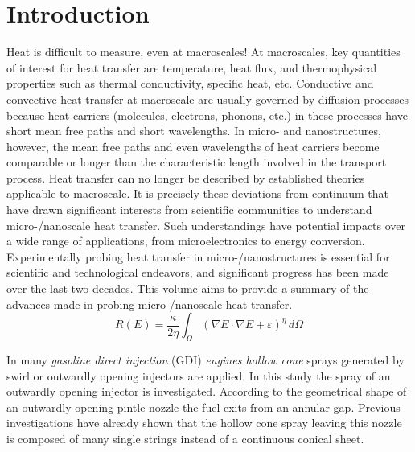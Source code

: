 \documentclass[article,authoryear,jfv]{beg_32}             %
\begin{document}
\section{Introduction}
Heat is difficult to measure, even at macroscales! At macroscales, key
quantities of interest for heat transfer are temperature, heat flux, and
thermophysical properties such as thermal conductivity, specific heat, etc.
Conductive and convective heat transfer at macroscale are usually governed
by diffusion processes because heat carriers (molecules, electrons, phonons,
etc.) in these processes have short mean free paths and short wavelengths.
In micro- and nanostructures, however, the mean free paths and even
wavelengths of heat carriers become comparable or longer than the
characteristic length involved in the transport process. Heat transfer can no longer be
described by established theories applicable to macroscale. It is precisely
these deviations from continuum that have drawn significant interests from
scientific communities to understand micro-/nanoscale heat transfer.
Such understandings have potential impacts over a wide range of
applications, from microelectronics to energy conversion. Experimentally
probing heat transfer in micro-/nanostructures is essential for scientific
and technological endeavors, and significant progress has been made over the
last two decades. This volume aims to provide a summary of the advances made
in probing micro-/nanoscale heat transfer.
\begin{equation}
  R(E) = \frac{\kappa}{2\eta} \int_{\Omega}\left( \nabla{E}\cdot\nabla{E} +
  \varepsilon \right)^{\eta} \, d\Omega
\end{equation}



In many \textit{gasoline direct injection} (GDI) {\it engines hollow cone} sprays generated by swirl or outwardly opening injectors are applied. In this study the spray of an outwardly opening injector is investigated. According to the geometrical shape of an outwardly opening pintle nozzle the fuel exits from an annular gap. Previous investigations have already shown that the hollow cone spray leaving this nozzle is composed of many single strings instead of a continuous conical sheet.
\end{document}
